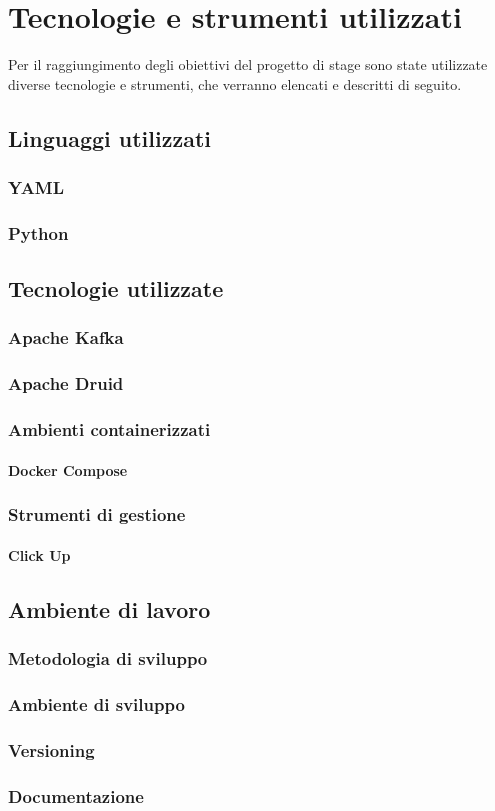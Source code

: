 \chapter{Tecnologie e strumenti utilizzati}\label{cap:Tecnologie e strumenti utilizzati}
Per il raggiungimento degli obiettivi del progetto di stage sono state utilizzate diverse tecnologie e strumenti, che verranno elencati e descritti di seguito.\\
\section{Linguaggi utilizzati}
\subsection{YAML}

\subsection{Python}
\section{Tecnologie utilizzate}
\subsection{Apache Kafka}

\subsection{Apache Druid}


\subsection{Ambienti containerizzati}
\subsubsection{Docker Compose}
\subsection{Strumenti di gestione}
\subsubsection{Click Up}   %
\section{Ambiente di lavoro}
\subsection{Metodologia di sviluppo}
\subsection{Ambiente di sviluppo}
\subsection{Versioning}
\subsection{Documentazione}
